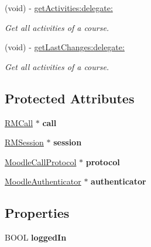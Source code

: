 \begin{DoxyCompactItemize}
(void) -\/ \hyperlink{interface_moodle_ad769405bd0d258ad32c1f4d247b54d57}{getActivities:delegate:}
\begin{DoxyCompactList}\small\item\em Get all activities of a course. \item\end{DoxyCompactList}\item 
(void) -\/ \hyperlink{interface_moodle_a6326606ca7ade3a39a82b0541dd60df1}{getLastChanges:delegate:}
\begin{DoxyCompactList}\small\item\em Get all activities of a course. \item\end{DoxyCompactList}\end{DoxyCompactItemize}
\subsection*{Protected Attributes}
\begin{DoxyCompactItemize}
\item 
\hypertarget{interface_moodle_aedf76d38f45ab54834da19f41df2f749}{
\hyperlink{interface_r_m_call}{RMCall} $\ast$ {\bfseries call}}
\label{interface_moodle_aedf76d38f45ab54834da19f41df2f749}

\item 
\hypertarget{interface_moodle_aff717c5349de2476696eef1117b2e4e1}{
\hyperlink{interface_r_m_session}{RMSession} $\ast$ {\bfseries session}}
\label{interface_moodle_aff717c5349de2476696eef1117b2e4e1}

\item 
\hypertarget{interface_moodle_abee9b303233b1bd2df73feea102f8535}{
\hyperlink{interface_moodle_call_protocol}{MoodleCallProtocol} $\ast$ {\bfseries protocol}}
\label{interface_moodle_abee9b303233b1bd2df73feea102f8535}

\item 
\hypertarget{interface_moodle_a43ace624b871ac153fdd592c899a70b7}{
\hyperlink{interface_moodle_authenticator}{MoodleAuthenticator} $\ast$ {\bfseries authenticator}}
\label{interface_moodle_a43ace624b871ac153fdd592c899a70b7}

\end{DoxyCompactItemize}
\subsection*{Properties}
\begin{DoxyCompactItemize}
\item 
\hypertarget{interface_moodle_a71abbe73dfe00064900f79f8a0217a70}{
BOOL {\bfseries loggedIn}}
\label{interface_moodle_a71abbe73dfe00064900f79f8a0217a70}

\end{DoxyCompactItemize}


